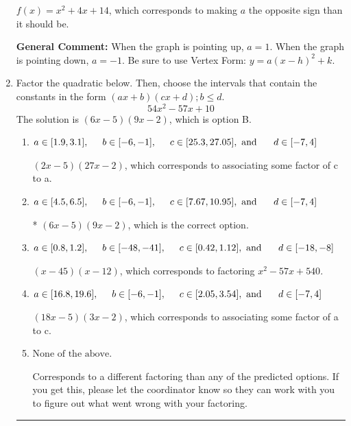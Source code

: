 \documentclass{extbook}[14pt]
\newcommand{\litem}[1]{\item #1

\rule{\textwidth}{0.4pt}}
\begin{document}
\begin{enumerate}
{\begin{enumerate}[label=\Alph*.]
$f(x)=x^{2} +4 x + 14$, which corresponds to making $a$ the opposite sign than it should be.
\end{enumerate}

\textbf{General Comment:} When the graph is pointing up, $a=1$. When the graph is pointing down, $a=-1$. Be sure to use Vertex Form: $y = a(x-h)^2+k$.
}
\litem{
Factor the quadratic below. Then, choose the intervals that contain the constants in the form $(ax+b)(cx+d); b \leq d.$
\[ 54x^{2} -57 x + 10 \]The solution is \( (6x -5)(9x -2) \), which is option B.\begin{enumerate}[label=\Alph*.]
\item \( a \in [1.9, 3.1], \hspace*{5mm} b \in [-6, -1], \hspace*{5mm} c \in [25.3, 27.05], \text{ and } \hspace*{5mm} d \in [-7, 4] \)

 $(2x -5)(27x -2)$, which corresponds to associating some factor of c to a.
\item \( a \in [4.5, 6.5], \hspace*{5mm} b \in [-6, -1], \hspace*{5mm} c \in [7.67, 10.95], \text{ and } \hspace*{5mm} d \in [-7, 4] \)

* $(6x -5)(9x -2)$, which is the correct option.
\item \( a \in [0.8, 1.2], \hspace*{5mm} b \in [-48, -41], \hspace*{5mm} c \in [0.42, 1.12], \text{ and } \hspace*{5mm} d \in [-18, -8] \)

 $(x -45)(x -12)$, which corresponds to factoring $x^{2} -57 x + 540$.
\item \( a \in [16.8, 19.6], \hspace*{5mm} b \in [-6, -1], \hspace*{5mm} c \in [2.05, 3.54], \text{ and } \hspace*{5mm} d \in [-7, 4] \)

 $(18x -5)(3x -2)$, which corresponds to associating some factor of a to c.
\item \( \text{None of the above.} \)

 Corresponds to a different factoring than any of the predicted options. If you get this, please let the coordinator know so they can work with you to figure out what went wrong with your factoring.
\end{enumerate}

}
\end{enumerate}
\end{document}
